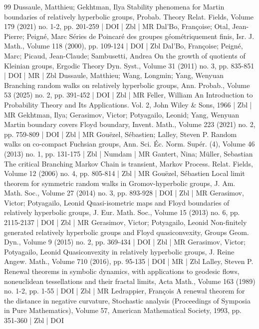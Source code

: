 \begin{thebibliography}{99}
 Dussaule, Matthieu; Gekhtman, Ilya Stability phenomena for Martin boundaries of relatively hyperbolic groups, Probab. Theory Relat. Fields, Volume 179 (2021) no. 1-2, pp. 201-259 | DOI | Zbl | MR
 Dal’Bo, Françoise; Otal, Jean-Pierre; Peigné, Marc Séries de Poincaré des groupes géométriquement finis, Isr. J. Math., Volume 118 (2000), pp. 109-124 | DOI | Zbl
 Dal’Bo, Françoise; Peigné, Marc; Picaud, Jean-Claude; Sambusetti, Andrea On the growth of quotients of Kleinian groups, Ergodic Theory Dyn. Syst., Volume 31 (2011) no. 3, pp. 835-851 | DOI | MR | Zbl
 Dussaule, Matthieu; Wang, Longmin; Yang, Wenyuan Branching random walks on relatively hyperbolic groups, Ann. Probab., Volume 53 (2025) no. 2, pp. 391-452 | DOI | Zbl | MR
 Feller, William An Introduction to Probability Theory and Its Applications. Vol. 2, John Wiley \& Sons, 1966 | Zbl | MR
 Gekhtman, Ilya; Gerasimov, Victor; Potyagailo, Leonid; Yang, Wenyuan Martin boundary covers Floyd boundary, Invent. Math., Volume 223 (2021) no. 2, pp. 759-809 | DOI | Zbl | MR
 Gouëzel, Sébastien; Lalley, Steven P. Random walks on co-compact Fuchsian groups, Ann. Sci. Éc. Norm. Supér. (4), Volume 46 (2013) no. 1, pp. 131-175 | Zbl | Numdam | MR
 Gantert, Nina; Müller, Sebastian The critical Branching Markov Chain is transient, Markov Process. Relat. Fields, Volume 12 (2006) no. 4, pp. 805-814 | Zbl | MR
 Gouëzel, Sébastien Local limit theorem for symmetric random walks in Gromov-hyperbolic groups, J. Am. Math. Soc., Volume 27 (2014) no. 3, pp. 893-928 | DOI | Zbl | MR
 Gerasimov, Victor; Potyagailo, Leonid Quasi-isometric maps and Floyd boundaries of relatively hyperbolic groups, J. Eur. Math. Soc., Volume 15 (2013) no. 6, pp. 2115-2137 | DOI | Zbl | MR
 Gerasimov, Victor; Potyagailo, Leonid Non-finitely generated relatively hyperbolic groups and Floyd quasiconvexity, Groups Geom. Dyn., Volume 9 (2015) no. 2, pp. 369-434 | DOI | Zbl | MR
 Gerasimov, Victor; Potyagailo, Leonid Quasiconvexity in relatively hyperbolic groups, J. Reine Angew. Math., Volume 710 (2016), pp. 95-135 | DOI | MR | Zbl
 Lalley, Steven P. Renewal theorems in symbolic dynamics, with applications to geodesic flows, noneuclidean tessellations and their fractal limits, Acta Math., Volume 163 (1989) no. 1-2, pp. 1-55 | DOI | Zbl | MR
 Ledrappier, François A renewal theorem for the distance in negative curvature, Stochastic analysis (Proceedings of Symposia in Pure Mathematics), Volume 57, American Mathematical Society, 1993, pp. 351-360 | Zbl | DOI

\end{thebibliography}
